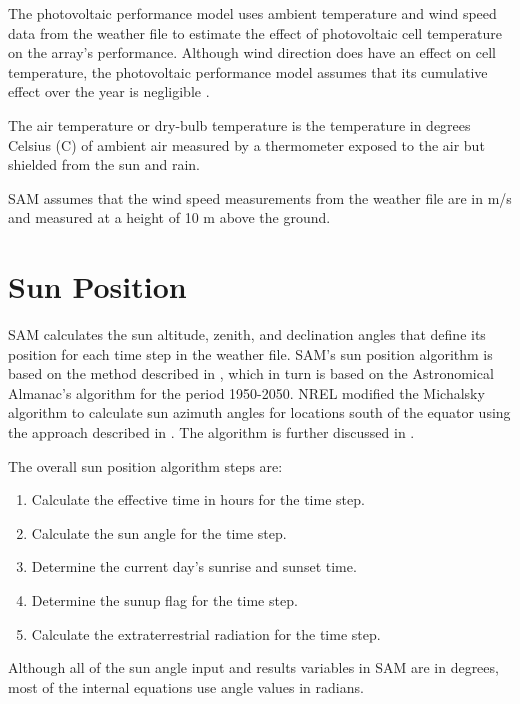 \documentclass[12pt,letterpaper]{article}
\begin{document}
The photovoltaic performance model uses ambient temperature and wind speed data from the weather file to estimate the effect of photovoltaic cell temperature on the array's performance. Although wind direction does have an effect on cell temperature, the photovoltaic performance model assumes that its cumulative effect over the year is negligible \citep{king2004}.

The air temperature or dry-bulb temperature is the temperature in degrees Celsius (\degree C) of ambient air measured by a thermometer exposed to the air but shielded from the sun and rain. 

SAM assumes that the wind speed measurements from the weather file are in m/s and measured at a height of 10 m above the ground.

\chapter{Sun Position}\label{sec-sunposition}

SAM calculates the sun altitude, zenith, and declination angles that define its position for each time step in the weather file. SAM's sun position algorithm is based on the method described in \citet{michalsky1988}, which in turn is based on the Astronomical Almanac's algorithm for the period 1950-2050. NREL modified the Michalsky algorithm to calculate sun azimuth angles for locations south of the equator using the approach described in \citep{iqbal1983}. The algorithm is further discussed in \citet{stackoverflow2012}.

The overall sun position algorithm steps are:
\begin{enumerate}
\item Calculate the effective time in hours for the time step.
\item Calculate the sun angle for the time step.
\item Determine the current day's sunrise and sunset time.
\item Determine the sunup flag for the time step.
\item Calculate the extraterrestrial radiation for the time step.
\end{enumerate}

Although all of the sun angle input and results variables in SAM are in degrees, most of the internal equations use angle values in radians.
\end{document}
